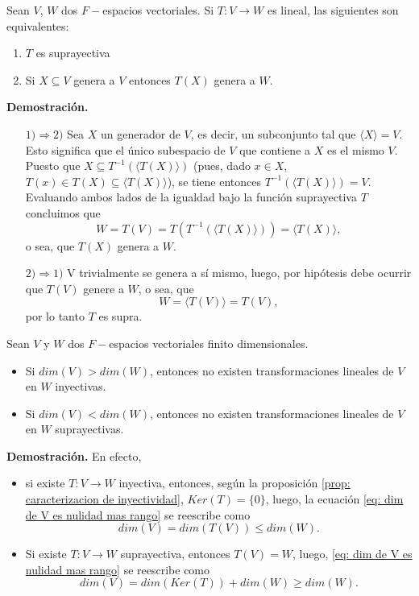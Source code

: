 \QEDB
\vspace{0.2cm}

\begin{prop}
Sean $V$, $W$ dos $F-$espacios vectoriales. Si $T: V \longrightarrow W$
es lineal, las siguientes son equivalentes:
\begin{enumerate}
	\item $T$ es suprayectiva
	\item Si $X \subseteq V$ genera a $V$ entonces $T(X)$
	genera a $W$.
\end{enumerate}
\end{prop}
\noindent
\textbf{Demostración.}
\begin{itemize}
	\item[$1) \Rightarrow 2)$] Sea $X$ un generador de $V$,
	es decir, un subconjunto tal que $\langle X \rangle = V$.
	Esto significa que el único subespacio de $V$ que contiene a 
	$X$ es el mismo $V$. Puesto que
	$X \subseteq T^{-1}(\langle T(X) \rangle)$
	(pues, dado $x \in X$, $T(x) \in T(X) \subseteq 
	\langle T(X) \rangle$), se tiene entonces
	$T^{-1}(\langle T(X) \rangle) = V$. Evaluando ambos lados
	de la igualdad bajo la función suprayectiva $T$ concluimos que
	\[
	W = T(V) = T(T^{-1}(\langle T(X) \rangle)) = \langle T(X) \rangle,
	\]
	o sea, que $T(X)$ genera a $W$.
	\item[$2) \Rightarrow 1)$] V trivialmente se genera a sí mismo,
	luego, por hipótesis debe ocurrir que $T(V)$ genere a $W$, o sea,
	que 
	\[
	W = \langle T(V) \rangle = T(V),
	\]
	por lo tanto $T$ es supra.
\end{itemize}

\QEDB
\vspace{0.2cm}

\begin{prop}
Sean $V$ y $W$ dos $F-$espacios vectoriales finito dimensionales.
\begin{itemize}
	\item Si $dim(V) > dim(W)$, entonces no existen transformaciones
	lineales de $V$ en $W$ inyectivas.
	\item Si $dim(V) < dim(W)$, entonces no existen transformaciones
	lineales de $V$ en $W$ suprayectivas.
\end{itemize}
\end{prop}
\noindent
\textbf{Demostración.}
En efecto, 
\begin{itemize}
	\item si existe $T: V \longrightarrow W$ inyectiva, entonces,
	según la proposición \ref{prop: caracterizacion de inyectividad},
	$Ker(T) = \{ 0 \}$, luego, la ecuación
	\eqref{eq: dim de V es nulidad mas rango} se reescribe como
	\[
	dim(V) = dim(T(V)) \leq dim(W).
	\]
	\item Si existe $T: V \longrightarrow W$ suprayectiva,
	entonces $T(V)= W$, luego, 
	\eqref{eq: dim de V es nulidad mas rango} se reescribe como
	\[
	dim(V) = dim(Ker(T)) + dim(W) \geq dim(W).
	\]
\end{itemize}
\QEDB
\vspace{0.2cm}

